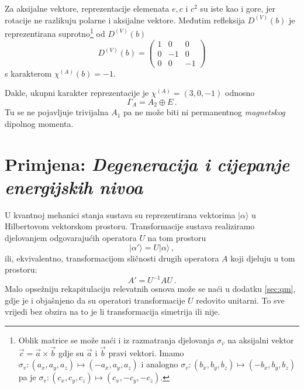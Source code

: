 Za aksijalne vektore, reprezentacije elemenata $e, c$ i $c^2$ su iste kao i
gore, jer rotacije ne razlikuju polarne i aksijalne vektore.  
Međutim refleksija $D^{(V)}(b)$ je reprezentirana
suprotno\footnote{Oblik matrice se može naći i iz razmatranja djelovanja $\sigma_{v}$ na
aksijalni vektor $\vec{c}=\vec{a}\times\vec{b}$ gdje 
su $\vec{a}$ i $\vec{b}$ pravi
vektori. Imamo $\sigma_{v}:(a_x, a_y, a_z)\mapsto (-a_x, a_y, a_z)$ i
 analogno $\sigma_{v}:(b_x, b_y, b_z)\mapsto (-b_x, b_y, b_z)$ pa je
 $\sigma_{v}:(c_x, c_y, c_z)\mapsto (c_x, -c_y, -c_z)$.} 
od $D^{(V)}(b)$
\begin{displaymath}
D^{(V)}(b)=
\begin{pmatrix}
1 & 0 & 0 \\
0 & -1 & 0 \\
0 & 0 & -1
\end{pmatrix}
\end{displaymath}
s karakterom $\chi^{(A)}(b)=-1$.

Dakle, ukupni karakter reprezentacije je $\chi^{(A)}=(3, 0, -1)$ odnosno
\begin{displaymath}
      \Gamma_{A} = A_2 \oplus E \,.
\end{displaymath}
Tu se ne pojavljuje trivijalna $A_1$ pa ne može biti ni permanentnog \emph{magnetskog}
dipolnog momenta.

\section{Primjena: \emph{Degeneracija i cijepanje energijskih nivoa}}
\label{sec:degeneracija}

U kvantnoj mehanici stanja sustava su reprezentirana vektorima
$|\alpha\rangle$ u Hilbertovom vektorskom prostoru. Transformacije
sustava realiziramo djelovanjem odgovarajućih operatora $U$ na tom prostoru
\begin{equation}
 |\alpha'\rangle = U |\alpha\rangle \,,
\end{equation}
ili, ekvivalentno, transformacijom sličnosti drugih 
operatora $A$ koji djeluju u tom prostoru:
\begin{equation}
   A' = U^{-1} A U \,.
\end{equation}
Malo opsežniju rekapitulaciju relevatnih osnova može se naći u dodatku
\ref{sec:qm}, gdje je i objašnjeno da su operatori transformacije $U$
redovito unitarni. To sve vrijedi bez obzira na to je li transformacija
simetrija ili nije.

